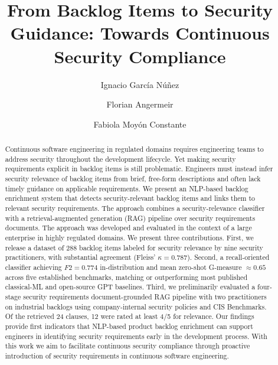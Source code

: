 \documentclass[sigconf,natbib=false,nonacm]{acmart}
\begin{document}
\title{From Backlog Items to Security Guidance: Towards Continuous Security Compliance}

\author{Ignacio García Núñez}

\author{Florian Angermeir}

\author{Fabiola Moyón Constante}

\begin{abstract}
Continuous software engineering in regulated domains requires engineering teams to address security throughout the development lifecycle.
Yet making security requirements explicit in backlog items is still problematic.
Engineers must instead infer security relevance of backlog items from brief, free-form descriptions and often lack timely guidance on applicable requirements. We present an NLP-based backlog enrichment system that detects security-relevant backlog items and links them to relevant security requirements. The approach combines a security-relevance classifier with a retrieval-augmented generation (RAG) pipeline over security requirements documents. The approach was developed and evaluated in the context of a large enterprise in highly regulated domains. We present three contributions. First, we release a dataset of 288 backlog items labeled for security relevance by nine security practitioners, with substantial agreement (Fleiss' $\kappa=0.787$). Second, a recall-oriented classifier achieving $F2=0.774$ in-distribution and mean zero-shot G-measure $\approx 0.65$ across five established benchmarks, matching or outperforming most published classical-ML and open-source GPT baselines. Third, we preliminarily evaluated a four-stage security requirements document-grounded RAG pipeline with two practitioners on industrial backlogs using company-internal security policies and CIS Benchmarks. Of the retrieved 24 clauses, 12 were rated at least 4/5 for relevance.
Our findings provide first indicators that NLP-based product backlog enrichment can support engineers in identifying security requirements early in the development process.
With this work we aim to facilitate continuous security compliance through proactive introduction of security requirements in continuous software engineering.
\end{abstract}
\end{document}
